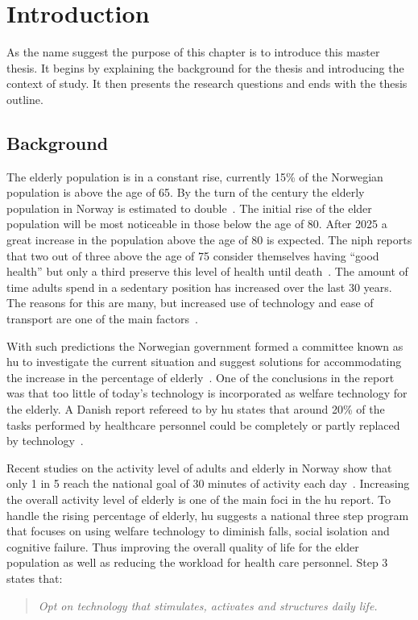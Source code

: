 \chapter{Introduction}
As the name suggest the purpose of this chapter is to introduce this master thesis. It begins by explaining the background for the thesis and introducing the context of study. It then presents the research questions and ends with the thesis outline.

\section{Background}
The elderly population is in a constant rise, currently 15\% of the Norwegian population is above the age of 65. By the turn of the century the elderly population in Norway is estimated to double~\cite{elder}. The initial rise of the elder population will be most noticeable in those below the age of 80. After 2025 a great increase in the population above the age of 80 is expected. The \gls{niph} reports that two out of three above the age of 75 consider themselves having ``good health'' but only a third preserve this level of health until death~\cite{elder}. The amount of time adults spend in a sedentary position has increased over the last 30 years. The reasons for this are many, but increased use of technology and ease of transport are one of the main factors~\cite{sedentaryBehaviour}.

With such predictions the Norwegian government formed a committee known as \gls{hu} to investigate the current situation and suggest solutions for accommodating the increase in the percentage of elderly~\cite{haagen}. One of the conclusions in the report was that too little of today's technology is incorporated as welfare technology for the elderly. A Danish report refereed to by \gls{hu} states that around 20\% of the tasks performed by healthcare personnel could be completely or partly replaced by technology~\cite{kmd}. 

Recent studies on the activity level of adults and elderly in Norway show that only 1 in 5 reach the national goal of 30 minutes of activity each day~\cite{fysiskAktivitet2009}. Increasing the overall activity level of elderly is one of the main foci in the \gls{hu} report. To handle the rising percentage of elderly, \gls{hu} suggests a national three step program that focuses on using welfare technology to diminish falls, social isolation and cognitive failure. Thus improving the overall quality of life for the elder population as well as reducing the workload for health care personnel. Step 3 states that:
\begin{quote}
\textit{Opt on technology that stimulates, activates and structures daily life.}
\end{quote}

